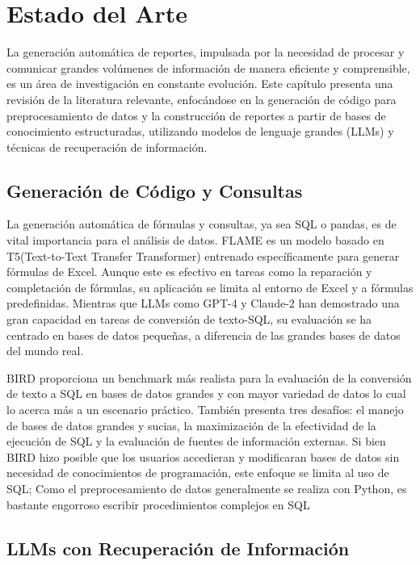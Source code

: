 \chapter{Estado del Arte}\label{chapter:state-of-the-art}

La generación automática de reportes, impulsada por la necesidad de procesar y comunicar grandes volúmenes de información de manera eficiente y comprensible, es un área de investigación en constante evolución. Este capítulo presenta una revisión de la literatura relevante, enfocándose en la generación de código para preprocesamiento de datos y la construcción de reportes a partir de bases de conocimiento estructuradas, utilizando modelos de lenguaje grandes (LLMs) y técnicas de recuperación de información.

\section{Generación de Código y Consultas}

La generación automática de fórmulas y consultas, ya sea SQL o pandas, es de vital importancia para el análisis de datos. FLAME \cite{joshi2024flame} es un modelo basado en T5(Text-to-Text Transfer Transformer)\cite{raffel2020exploring} entrenado específicamente para generar fórmulas de Excel. Aunque este es efectivo en tareas como la reparación y completación de fórmulas, su aplicación se limita al entorno de Excel y a fórmulas predefinidas. Mientras que LLMs como GPT-4 y Claude-2 han demostrado una gran capacidad en tareas de conversión de texto-SQL, su evaluación se ha centrado en bases de datos pequeñas, a diferencia de las grandes bases de datos del mundo real.

BIRD \cite{li2024can} proporciona un benchmark más realista para la evaluación de la conversión de texto a SQL en bases de datos grandes y con mayor variedad de datos lo cual lo acerca más a un escenario práctico. También presenta tres desafíos: el manejo de bases de datos grandes y sucias, la maximización de la efectividad de la ejecución de SQL y la evaluación de fuentes de información externas. Si bien BIRD hizo posible que los usuarios accedieran y modificaran bases de datos sin necesidad de conocimientos de programación, este enfoque se limita al uso de SQL; Como el preprocesamiento de datos generalmente se realiza con Python, es bastante engorroso escribir procedimientos complejos en SQL

\section{LLMs con Recuperación de Información}

